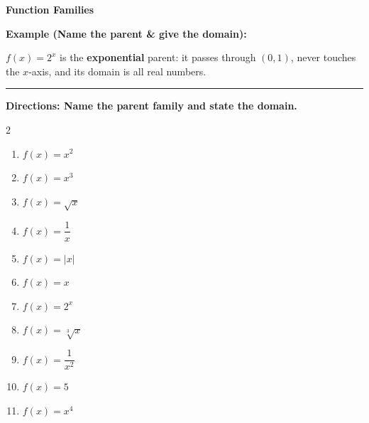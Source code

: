 \documentclass[12pt]{article}
\begin{document}
\vspace{0.35cm}

\begin{center}{\Large \textbf{Function Families}}\end{center}\vspace{0.2cm}
\textbf{Example (Name the parent \& give the domain):}

$f(x)=2^{x}$ is the \textbf{exponential} parent: it passes through $(0,1)$, never touches the $x$-axis, and its domain is all real numbers.

\vspace{0.2cm}\hrule\vspace{0.35cm}
\textbf{Directions: Name the parent family and state the domain.}

\begin{multicols}{2}
\begin{enumerate}[label=\textbf{\arabic*.}, start=1, itemsep=2cm]
  \item $\displaystyle f(x)=x^{2}$
  \item $\displaystyle f(x)=x^{3}$
  \item $\displaystyle f(x)=\sqrt{x}$
  \item $\displaystyle f(x)=\dfrac{1}{x}$
  \item $\displaystyle f(x)=|x|$
  \item $\displaystyle f(x)=x$
  \item $\displaystyle f(x)=2^{x}$
  \item $\displaystyle f(x)=\sqrt[3]{x}$
  \item $\displaystyle f(x)=\dfrac{1}{x^{2}}$
  \item $\displaystyle f(x)=5$
  \item $\displaystyle f(x)=x^{4}$
\end{enumerate}
\end{multicols}
\end{document}
